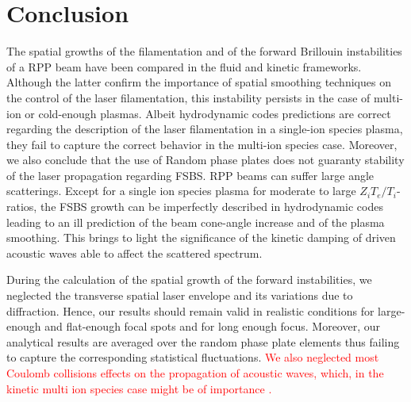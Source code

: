 \documentclass[
 reprint,
 superscriptaddress,
 amsmath,amssymb,
 aps,
]{revtex4-1}
\def\tc{\textcolor{red}}
\begin{document}
\section{Conclusion}
The spatial growths of the filamentation and of the forward Brillouin instabilities of a RPP beam have been compared in the fluid and kinetic frameworks. Although the latter confirm the importance  of spatial smoothing techniques on the control of the laser filamentation, this instability persists in the case of multi-ion  or cold-enough plasmas.
Albeit hydrodynamic codes predictions are correct regarding the description of the laser filamentation in a single-ion species plasma,
they fail to capture the correct behavior in the multi-ion species case. 
Moreover, we also conclude that the use of Random phase plates does not guaranty stability of the laser propagation regarding FSBS. RPP beams can suffer large angle scatterings.
Except for a single ion species plasma for moderate to large  $Z_iT_e/T_i$-ratios, the FSBS growth can be imperfectly described in hydrodynamic codes leading to an ill prediction of the beam cone-angle increase and of the plasma smoothing. 
This brings to light the significance of the kinetic damping of driven acoustic waves able to  affect the scattered spectrum.

During the calculation of the spatial growth of the forward instabilities, we neglected the transverse spatial laser envelope and its variations due to diffraction. Hence, our results should remain valid in realistic conditions for large-enough and flat-enough focal spots and for long enough focus. Moreover,  our analytical results are averaged over the random phase plate elements thus failing to capture the corresponding statistical fluctuations. 
\tc{
We also neglected most Coulomb collisions effects on the propagation of acoustic waves, which, in the kinetic multi ion species case might be of importance  \cite[]{POP_Berger_2005b}. 
}
\end{document}
